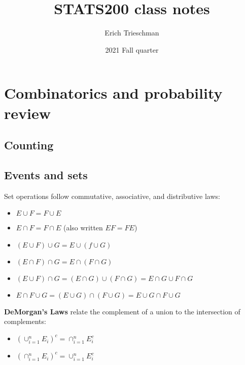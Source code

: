 \documentclass{article}
\title{STATS200 class notes}
\author{Erich Trieschman}
\date{2021 Fall quarter}
\begin{document}
\maketitle

\section{Combinatorics and probability review}
\subsection{Counting}

\subsection{Events and sets}
Set operations follow commutative, associative, and distributive laws:
\begin{itemize}
    \item $E \cup F = F \cup E$
    \item $E\cap F = F \cap E $ (also written $EF = FE$)
    \item $(E\cup F)\cup G = E \cup (f\cup G)$
    \item $(E\cap F)\cap G = E\cap(F\cap G)$
    \item $(E\cup F)\cap G = (E\cap G) \cup (F \cap G) = E\cap G \cup F \cap G$
    \item $E\cap F\cup G = (E\cup G) \cap (F \cup G) = E\cup G \cap F \cup G$
\end{itemize}
\textbf{DeMorgan's Laws} relate the complement of a union to the intersection of complements:
\begin{itemize}
    \item $(\cup_{i=1}^n E_i)^c = \cap_{i=1}^nE_i^c$
    \item $(\cap_{i=1}^n E_i)^c = \cup_{i=1}^nE_i^c$
\end{itemize}

\end{document}
